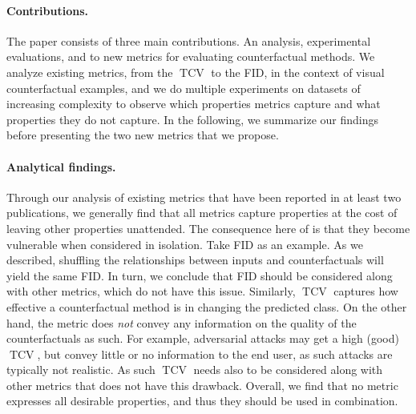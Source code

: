\documentclass[11pt,a4paper,twoside,openright,final]{memoir}
\newcommand*{\paperref}[1]{Paper~\hyperref[#1]{\ref{#1}}}
\begin{document}
\paragraph{Contributions.}
The paper consists of three main contributions.
An analysis, experimental evaluations, and to new metrics for evaluating counterfactual methods.
We analyze existing metrics, from the $\operatorname{TCV}$ to the FID, in the context of visual counterfactual examples, and we do multiple experiments on datasets of increasing complexity to observe which properties metrics capture and what properties they do not capture.
In the following, we summarize our findings before presenting the two new metrics that we propose.

\paragraph{Analytical findings.}
Through our analysis of existing metrics that have been reported in at least two publications, we generally find that all metrics capture properties at the cost of leaving other properties unattended.
The consequence here of is that they become vulnerable when considered in isolation.
Take FID as an example.
As we described, shuffling the relationships between inputs and counterfactuals will yield the same FID.
In turn, we conclude that FID should be considered along with other metrics, which do not have this issue.
Similarly, $\operatorname{TCV}$ captures how effective a counterfactual method is in changing the predicted class. 
On the other hand, the metric does \emph{not} convey any information on the quality of the counterfactuals as such.
For example, adversarial attacks may get a high (good) $\operatorname{TCV}$, but convey little or no information to the end user, as such attacks are typically not realistic.
As such $\operatorname{TCV}$ needs also to be considered along with other metrics that does not have this drawback.
Overall, we find that no metric expresses all desirable properties, and thus they should be used in combination.
\end{document}
